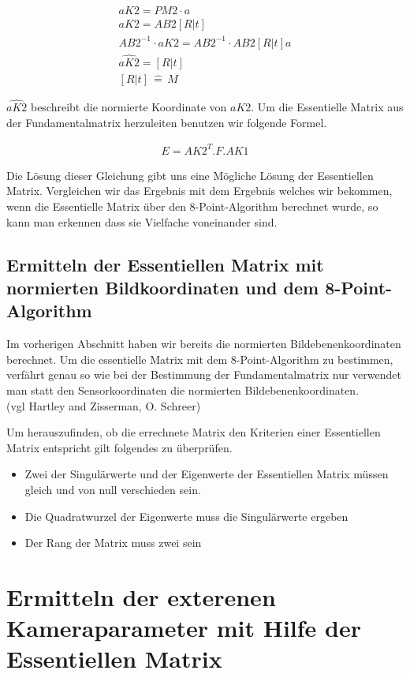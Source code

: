 \begin{gather}
aK2 = PM2\cdot a\\
aK2 = AB2[R|t]\\
AB2^{-1}\cdot aK2 = AB2^{-1}\cdot AB2[R|t] a\\
\hat{aK2} = [R|t]\\
[R|t]\, \widehat{=} \, M
\end{gather}

\ensuremath{\hat{aK2}} beschreibt die normierte Koordinate von \ensuremath{aK2}. Um die Essentielle Matrix aus der Fundamentalmatrix herzuleiten benutzen wir folgende Formel.

\begin{gather}
E = AK2^T.F.AK1
\end{gather}

Die Lösung dieser Gleichung gibt uns eine Mögliche Lösung der Essentiellen Matrix. Vergleichen wir das Ergebnis mit dem Ergebnis welches wir bekommen, wenn die Essentielle Matrix über den 8-Point-Algorithm berechnet wurde, so kann man erkennen dass sie Vielfache voneinander sind.

\subsection{Ermitteln der Essentiellen Matrix mit normierten Bildkoordinaten und dem 8-Point-Algorithm}

	Im vorherigen Abschnitt haben wir bereits die normierten Bildebenenkoordinaten berechnet. Um die essentielle Matrix mit dem 8-Point-Algorithm zu bestimmen, verfährt genau so wie bei der Bestimmung der Fundamentalmatrix nur verwendet man statt den Sensorkoordinaten die normierten Bildebenenkoordinaten.\\ (vgl Hartley and Zisserman, O. Schreer)

Um herauszufinden, ob die errechnete Matrix den Kriterien einer Essentiellen Matrix entspricht gilt folgendes zu überprüfen.

\begin{itemize}
	\item Zwei der Singulärwerte und der Eigenwerte der Essentiellen Matrix müssen gleich und von null verschieden sein.
	\item Die Quadratwurzel der Eigenwerte muss die Singulärwerte ergeben
	\item Der Rang der Matrix muss zwei sein
\end{itemize}

\section{Ermitteln der exterenen Kameraparameter mit Hilfe der Essentiellen Matrix}

